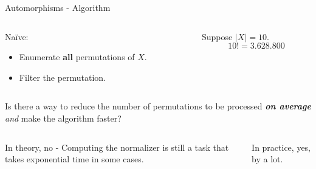 \begin{frame}{Automorphisms - Algorithm}

\begin{columns}
\begin{column}{0.6\textwidth}
Naïve:
\begin{itemize}
     \item Enumerate \textbf{all} permutations of $X$.
     \item Filter the permutation. 
 \end{itemize}
\end{column}
\begin{column}{0.4\textwidth}
\begin{example}
        Suppose $\mid X \mid = 10$. 
        \[10! = 3.628.800\]
\end{example}
\end{column}
\end{columns}
 

\begin{center}
     Is there a way to reduce the number of permutations to be processed \newline \emph{\textbf{on average} and} make the algorithm faster?\newline\newline
     \textcolor{darkred}{} 
\end{center}
\begin{columns}
\begin{column}{0.5\textwidth}
\begin{center}
    In theory, no - Computing the normalizer is still a task that takes exponential time in some cases. 
\end{center}
\end{column}
\begin{column}{0.5\textwidth}
\begin{center}
    In practice, yes, by a lot.
\end{center}
\end{column}
\end{columns}
\end{frame}





